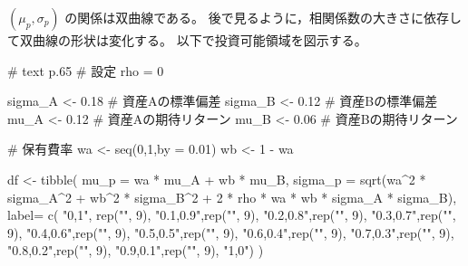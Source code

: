 \documentclass[
  letterpaper,
  pandoc,
  ja=standard,
  jafont = hiragino-pron]{ltjsbook}
\newenvironment{Shaded}{\begin{snugshade}}{\end{snugshade}}
\newcommand{\AttributeTok}[1]{\textcolor[rgb]{0.40,0.45,0.13}{#1}}
\newcommand{\CommentTok}[1]{\textcolor[rgb]{0.37,0.37,0.37}{#1}}
\newcommand{\DecValTok}[1]{\textcolor[rgb]{0.68,0.00,0.00}{#1}}
\newcommand{\FloatTok}[1]{\textcolor[rgb]{0.68,0.00,0.00}{#1}}
\newcommand{\FunctionTok}[1]{\textcolor[rgb]{0.28,0.35,0.67}{#1}}
\newcommand{\NormalTok}[1]{\textcolor[rgb]{0.00,0.23,0.31}{#1}}
\newcommand{\OtherTok}[1]{\textcolor[rgb]{0.00,0.23,0.31}{#1}}
\newcommand{\SpecialCharTok}[1]{\textcolor[rgb]{0.37,0.37,0.37}{#1}}
\newcommand{\StringTok}[1]{\textcolor[rgb]{0.13,0.47,0.30}{#1}}
\begin{document}
\((\mu _p , \sigma _p)\) の関係は双曲線である。
後で見るように，相関係数の大きさに依存して双曲線の形状は変化する。
以下で投資可能領域を図示する。

\begin{Shaded}
\begin{Highlighting}[]
\CommentTok{\# text p.65}
\CommentTok{\# 設定}
\NormalTok{rho }\OtherTok{=} \DecValTok{0}

\NormalTok{sigma\_A }\OtherTok{\textless{}{-}} \FloatTok{0.18}  \CommentTok{\# 資産Aの標準偏差}
\NormalTok{sigma\_B }\OtherTok{\textless{}{-}} \FloatTok{0.12}  \CommentTok{\# 資産Bの標準偏差}
\NormalTok{mu\_A }\OtherTok{\textless{}{-}} \FloatTok{0.12}     \CommentTok{\# 資産Aの期待リターン}
\NormalTok{mu\_B }\OtherTok{\textless{}{-}} \FloatTok{0.06}     \CommentTok{\# 資産Bの期待リターン}

\CommentTok{\# 保有費率}
\NormalTok{wa }\OtherTok{\textless{}{-}} \FunctionTok{seq}\NormalTok{(}\DecValTok{0}\NormalTok{,}\DecValTok{1}\NormalTok{,}\AttributeTok{by =} \FloatTok{0.01}\NormalTok{)}
\NormalTok{wb }\OtherTok{\textless{}{-}} \DecValTok{1} \SpecialCharTok{{-}}\NormalTok{ wa}

\NormalTok{df }\OtherTok{\textless{}{-}} \FunctionTok{tibble}\NormalTok{(}
  \AttributeTok{mu\_p =}\NormalTok{ wa }\SpecialCharTok{*}\NormalTok{ mu\_A }\SpecialCharTok{+}\NormalTok{ wb }\SpecialCharTok{*}\NormalTok{ mu\_B,}
  \AttributeTok{sigma\_p =} \FunctionTok{sqrt}\NormalTok{(wa}\SpecialCharTok{\^{}}\DecValTok{2} \SpecialCharTok{*}\NormalTok{ sigma\_A}\SpecialCharTok{\^{}}\DecValTok{2} \SpecialCharTok{+}\NormalTok{ wb}\SpecialCharTok{\^{}}\DecValTok{2} \SpecialCharTok{*}\NormalTok{ sigma\_B}\SpecialCharTok{\^{}}\DecValTok{2} \SpecialCharTok{+} \DecValTok{2} \SpecialCharTok{*}\NormalTok{ rho }\SpecialCharTok{*}\NormalTok{ wa }\SpecialCharTok{*}\NormalTok{ wb }\SpecialCharTok{*}\NormalTok{ sigma\_A }\SpecialCharTok{*}\NormalTok{ sigma\_B),}
  \AttributeTok{label=} \FunctionTok{c}\NormalTok{(}
  \StringTok{"0,1"}\NormalTok{, }\FunctionTok{rep}\NormalTok{(}\StringTok{""}\NormalTok{, }\DecValTok{9}\NormalTok{),}
  \StringTok{"0.1,0.9"}\NormalTok{,}\FunctionTok{rep}\NormalTok{(}\StringTok{""}\NormalTok{, }\DecValTok{9}\NormalTok{),}
  \StringTok{"0.2,0.8"}\NormalTok{,}\FunctionTok{rep}\NormalTok{(}\StringTok{""}\NormalTok{, }\DecValTok{9}\NormalTok{),}
  \StringTok{"0.3,0.7"}\NormalTok{,}\FunctionTok{rep}\NormalTok{(}\StringTok{""}\NormalTok{, }\DecValTok{9}\NormalTok{),}
  \StringTok{"0.4,0.6"}\NormalTok{,}\FunctionTok{rep}\NormalTok{(}\StringTok{""}\NormalTok{, }\DecValTok{9}\NormalTok{),}
  \StringTok{"0.5,0.5"}\NormalTok{,}\FunctionTok{rep}\NormalTok{(}\StringTok{""}\NormalTok{, }\DecValTok{9}\NormalTok{),}
  \StringTok{"0.6,0.4"}\NormalTok{,}\FunctionTok{rep}\NormalTok{(}\StringTok{""}\NormalTok{, }\DecValTok{9}\NormalTok{),}
  \StringTok{"0.7,0.3"}\NormalTok{,}\FunctionTok{rep}\NormalTok{(}\StringTok{""}\NormalTok{, }\DecValTok{9}\NormalTok{),}
  \StringTok{"0.8,0.2"}\NormalTok{,}\FunctionTok{rep}\NormalTok{(}\StringTok{""}\NormalTok{, }\DecValTok{9}\NormalTok{),}
  \StringTok{"0.9,0.1"}\NormalTok{,}\FunctionTok{rep}\NormalTok{(}\StringTok{""}\NormalTok{, }\DecValTok{9}\NormalTok{),}
  \StringTok{"1,0"}\NormalTok{)}
\NormalTok{  )}


\end{Highlighting}
\end{Shaded}
\end{document}
